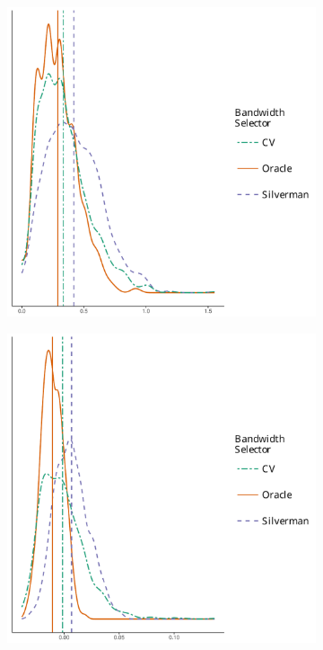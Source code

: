\begin{figure}[htbp]
    \centering
    \begin{subfigure}[b]{0.45\textwidth}
        \includegraphics[width=\textwidth]{output/peak-dist-histogram}
        \label{fig:peaks:unif_100_1.0_1h:dist}
    \end{subfigure}
    \begin{subfigure}[b]{0.45\textwidth}
        \includegraphics[width=\textwidth]{output/peak-height-histogram}

\end{subfigure}
\end{figure}
